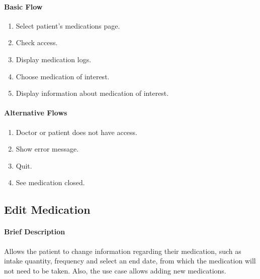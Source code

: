 \documentclass{report}
\begin{document}
\begin{multicols}{2}
    \paragraph{Basic Flow}
    \begin{enumerate}
        \item Select patient's medications page.
        \item Check access.
        \item Display medication logs.
        \item Choose medication of interest.
        \item Display information about medication of interest.
    \end{enumerate}
    \columnbreak

    \paragraph{Alternative Flows}
    \begin{enumerate}[label=A\arabic*.]
        \item Doctor or patient does not have access.
        \item Show error message.
        \item Quit.
        \item See medication closed.
    \end{enumerate}
\end{multicols}

\vspace{1em}
\subsection{Edit Medication}
\paragraph{Brief Description}
Allows the patient to change information regarding their medication, such as intake quantity, frequency and select an end date, from which the medication will not need to be taken.
Also, the use case allows adding new medications.
\end{document}
